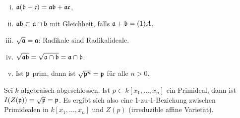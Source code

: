 \begin{nt}
    \begin{enumerate}[(i)]
        \item
            $\mathfrak{a} (\mathfrak{b}  + \mathfrak{c}) = \mathfrak{a} \mathfrak{b} + \mathfrak{a} \mathfrak{c}$,
        \item
            $\mathfrak{a} \mathfrak{b} \subset \mathfrak{a} \cap \mathfrak{b}$ mit Gleichheit, falls $\mathfrak{a} + \mathfrak{b} = (1) A$.
        \item
            $\sqrt{\mathfrak{a}} = \mathfrak{a}$: Radikale sind Radikalideale.
        \item
            $\sqrt{\mathfrak{a} \mathfrak{b}} = \sqrt{\mathfrak{a} \cap \mathfrak{b}} = \mathfrak{a} \cap \mathfrak{b}$.
        \item
            Ist $\mathfrak{p}$ prim, dann ist $\sqrt{{\mathfrak{p}}^n} = \mathfrak{p}$ für alle $n > 0$.
    \end{enumerate}
\end{nt}

\begin{nt}
    Sei $k$ algebraisch abgeschlossen.
    Ist $p \subset k[x_1, \dotsc, x_n]$ ein Primideal, dann ist $I(Z(\mathfrak{p})) = \sqrt{\mathfrak{p}} = \mathfrak{p}$.
    Es ergibt sich also eine 1-zu-1-Beziehung zwischen Primidealen in $k[x_1, \dotsc, x_n]$ und $Z(p)$ (irreduzible affine Varietät).
\end{nt}

